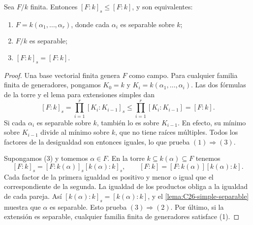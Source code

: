 \begin{prop}\label{prop:C26-separable-generadores}
Sea $F/k$ finita. Entonces $[F:k]_s\leq[F:k]$, y son equivalentes:
\begin{enumerate}[nosep]
\item $F=k(\alpha_1,\ldots,\alpha_r)$, donde cada $\alpha_i$ es separable sobre $k$;
\item $F/k$ es separable;
\item $[F:k]_s=[F:k]$.
\end{enumerate}
\end{prop}
\begin{proof}
Una base vectorial finita genera $F$ como campo. Para cualquier familia finita de generadores, pongamos $K_0=k$ y $K_i=k(\alpha_1,\ldots,\alpha_i)$. Las dos fórmulas de la torre y el lema para extensiones simples dan
\[
[F:k]_s=\prod_{i=1}^r[K_i:K_{i-1}]_s
\leq\prod_{i=1}^r[K_i:K_{i-1}]=[F:k].
\]
Si cada $\alpha_i$ es separable sobre $k$, también lo es sobre $K_{i-1}$. En efecto, su mínimo sobre $K_{i-1}$ divide al mínimo sobre $k$, que no tiene raíces múltiples. Todos los factores de la desigualdad son entonces iguales, lo que prueba $(1)\Rightarrow(3)$.

Supongamos (3) y tomemos $\alpha\in F$. En la torre $k\subseteq k(\alpha)\subseteq F$ tenemos
\[
[F:k]_s=[F:k(\alpha)]_s[k(\alpha):k]_s,
\qquad
[F:k]=[F:k(\alpha)][k(\alpha):k].
\]
Cada factor de la primera igualdad es positivo y menor o igual que el correspondiente de la segunda. La igualdad de los productos obliga a la igualdad de cada pareja. Así $[k(\alpha):k]_s=[k(\alpha):k]$, y el \cref{lema:C26-simple-separable} muestra que $\alpha$ es separable. Esto prueba $(3)\Rightarrow(2)$. Por último, si la extensión es separable, cualquier familia finita de generadores satisface (1).
\end{proof}

